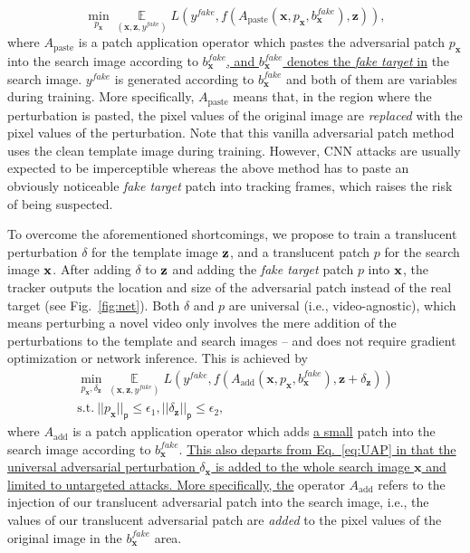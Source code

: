 \documentclass[journal]{IEEEtran}
\newcommand{\ie}{i.e.}
\begin{document}
\begin{equation}
    \min\limits_{p_\textbf{x}} \mathop{\mathbb{E}}\limits_{(\textbf{x}, \textbf{z}, y^{fake})} L(y^{fake}, f(A_{\text{paste}}(\textbf{x}, p_\textbf{x}, b^{fake}_{\textbf{x}}), \textbf{z})),
\end{equation}
where $A_{\text{paste}}$ is a patch application operator \cite{patch} which pastes the adversarial patch $p_\textbf{x}$ into the search image according to $b^{fake}_{\textbf{x}}$\uline{, and $b^{fake}_{\textbf{x}}$ denotes the \textit{fake target} in} the search image. $y^{fake}$ is generated according to $b^{fake}_{\textbf{x}}$ and both of them are variables during training. More specifically, $A_\text{paste}$ means that, in the region where the perturbation is pasted, the pixel values of the original image are \textit{replaced} with the pixel values of the perturbation. Note that this vanilla adversarial patch method uses the clean template image during training. However, CNN attacks are usually expected to be imperceptible whereas the above method has to paste an obviously noticeable \textit{fake target} patch into tracking frames, which raises the risk of being suspected.

To overcome the aforementioned shortcomings, we propose to train a translucent perturbation $\delta$ for the template image $\textbf z$, and a translucent patch $p$ for the search image $\textbf x$. After adding $\delta$ to $\textbf z$ and adding the \textit{fake target} patch $p$ into $\textbf x$, the tracker outputs the location and size of the adversarial patch instead of the real target (see Fig.~\ref{fig:net}). Both $\delta$ and $p$ are universal (\ie, video-agnostic), which means perturbing a novel video only involves the mere addition of the perturbations to the template and search images -- and does not require gradient optimization or network inference. This is achieved by
\begin{equation}
  \begin{gathered}
    \min\limits_{p_\textbf{x}, \delta_\textbf{z}} \mathop{\mathbb{E}}\limits_{(\textbf{x}, \textbf{z}, y^{fake})} L(y^{fake}, f(A_{\text{add}}(\textbf{x}, p_\textbf{x}, b^{fake}_{\textbf{x}}), \textbf{z} + \delta_\textbf{z}))\\
    \text{s.t.}\ ||p_\textbf{x}||_{\mathsf{p}} \le \epsilon_1, ||\delta_\textbf{z}||_{\mathsf{p}} \le \epsilon_2,
  \end{gathered}
\end{equation}
where $A_{\text{add}}$ is a patch application operator which adds \uline{a small} patch into the search image according to $b^{fake}_{\textbf{x}}$. \uline{This also departs from Eq.~\eqref{eq:UAP} in that the universal adversarial perturbation $\delta_\textbf{x}$ is added to the whole search image $\textbf{x}$ and limited to untargeted attacks. More specifically, the} operator $A_\text{add}$ refers to the injection of our translucent adversarial patch into the search image, \ie, the values of our translucent adversarial patch are \textit{added} to the pixel values of the original image in the $b^{fake}_{\textbf{x}}$ area.
\end{document}
